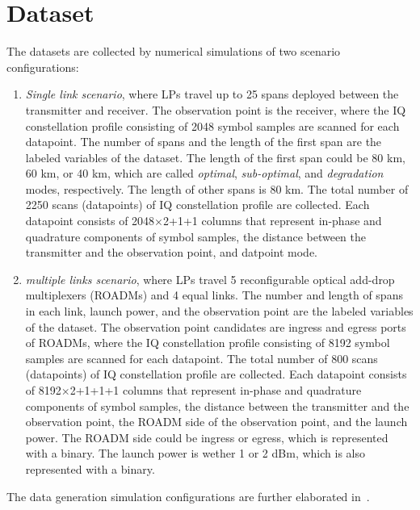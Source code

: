 \documentclass[lettersize,journal, one-column]{IEEEtran}
\begin{document}
\section{Dataset}
\label{section:dataset}
The datasets are collected by numerical simulations of two scenario configurations:
\begin{enumerate}
    \item \textit{Single link scenario}, where LPs travel up to 25 spans deployed between the transmitter and receiver.
    The observation point is the receiver, where the IQ constellation profile consisting of 2048 symbol samples are scanned for each datapoint.
    The number of spans and the length of the first span are the labeled variables of the dataset.
    The length of the first span could be 80 km, 60 km, or 40 km, which are called \textit{optimal}, \textit{sub-optimal}, and \textit{degradation} modes, respectively.
    The length of other spans is 80 km.
    The total number of  2250 scans (datapoints) of IQ constellation profile are collected.
    Each datapoint consists of 2048$\times$2+1+1 columns that represent in-phase and quadrature components of symbol samples, the distance between the transmitter and the observation point, and datpoint mode.
    \item \textit{multiple links scenario}, where LPs travel 5 reconfigurable optical add-drop multiplexers (ROADMs) and 4 equal links.
    The number and length of spans in each link, launch power, and the observation point are the labeled variables of the dataset.
    The observation point candidates are ingress and egress ports of ROADMs, where the IQ constellation profile consisting of 8192 symbol samples are scanned for each datapoint.
    The total number of 800 scans (datapoints) of IQ constellation profile are collected.
    Each datapoint consists of 8192$\times$2+1+1+1 columns that represent in-phase and quadrature components of symbol samples, the distance between the transmitter and the observation point, the ROADM side of the observation point, and the launch power.
    The ROADM side could be ingress or egress, which is represented with a binary.
    The launch power is wether 1 or 2 dBm, which is also represented with a binary.
\end{enumerate}
The data generation simulation configurations are further elaborated in~\cite{data146_2022}.
\end{document}
